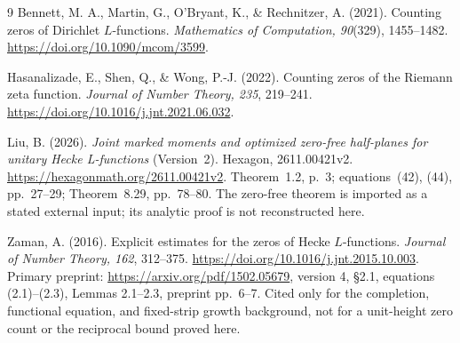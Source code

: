\documentclass[11pt]{article}
\numberwithin{equation}{section}
\begin{document}
\begin{thebibliography}{9}
Bennett, M. A., Martin, G., O'Bryant, K., \& Rechnitzer, A. (2021).
Counting zeros of Dirichlet $L$-functions.
\emph{Mathematics of Computation, 90}(329), 1455--1482.
\url{https://doi.org/10.1090/mcom/3599}.

Hasanalizade, E., Shen, Q., \& Wong, P.-J. (2022).
Counting zeros of the Riemann zeta function.
\emph{Journal of Number Theory, 235}, 219--241.
\url{https://doi.org/10.1016/j.jnt.2021.06.032}.

Liu, B. (2026).
\emph{Joint marked moments and optimized zero-free half-planes for
unitary Hecke L-functions} (Version~2). Hexagon, 2611.00421v2.
\url{https://hexagonmath.org/2611.00421v2}.
Theorem~1.2, p.~3; equations~(42), (44), pp.~27--29;
Theorem~8.29, pp.~78--80. The zero-free theorem is imported as a
stated external input; its analytic proof is not reconstructed here.

Zaman, A. (2016).
Explicit estimates for the zeros of Hecke $L$-functions.
\emph{Journal of Number Theory, 162}, 312--375.
\url{https://doi.org/10.1016/j.jnt.2015.10.003}.
Primary preprint: \url{https://arxiv.org/pdf/1502.05679},
version 4, \S2.1, equations (2.1)--(2.3), Lemmas 2.1--2.3,
preprint pp.~6--7. Cited only for the completion, functional equation,
and fixed-strip growth background, not for a unit-height zero count
or the reciprocal bound proved here.
\end{thebibliography}
\end{document}
